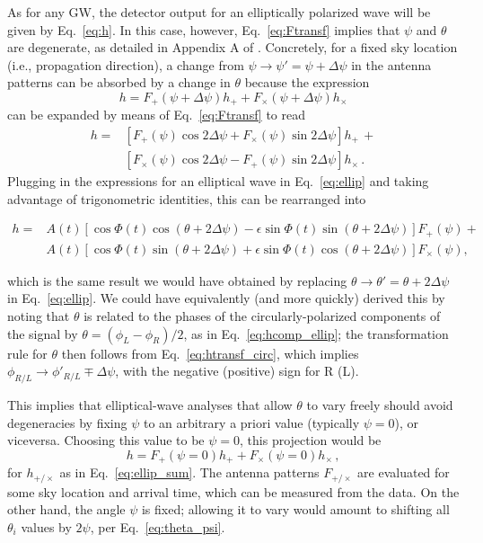 \documentclass[aps,prd,twocolumn,superscriptaddress,preprintnumbers,floatfix,nofootinbib]{revtex4-2}
\newcommand{\beq}{\begin{equation}}
\newcommand{\eeq}{\end{equation}}
\newcommand*{\eq}[1]{Eq.~\eqref{eq:#1}}
\begin{document}

As for any GW, the detector output for an elliptically polarized wave will be given by \eq{h}.
In this case, however, \eq{Ftransf} implies that $\psi$ and $\theta$ are degenerate, as detailed in Appendix A of \cite{Isi:2017equ}.
Concretely, for a fixed sky location (i.e., propagation direction), a change from $\psi \to \psi' = \psi + \Delta\psi$ in the antenna patterns can be absorbed by a change in $\theta$ because the expression
\beq
h = F_+(\psi + \Delta \psi) h_+ + F_\times(\psi + \Delta \psi) h_\times 
\eeq
can be expanded by means of \eq{Ftransf} to read
\begin{align}
h = &\left[ F_+(\psi) \cos 2\Delta\psi + F_\times(\psi) \sin 2\Delta\psi \right] h_+\, + \\
 &\left[F_\times(\psi) \cos 2\Delta\psi - F_+(\psi)\sin 2\Delta\psi\right] h_\times \, .
\end{align}
Plugging in the expressions for an elliptical wave in \eq{ellip} and taking advantage of trigonometric identities, this can be rearranged into
\begin{widetext}
\begin{align} \label{eq:theta_psi}
h = & A(t) \left[\cos \Phi(t) \cos(\theta + 2\Delta\psi) -  \epsilon \sin \Phi(t)\sin(\theta + 2\Delta\psi) \right] F_+(\psi) +\nonumber\\
&A(t) \left[\cos \Phi(t) \sin(\theta + 2\Delta\psi) + \epsilon \sin \Phi(t) \cos(\theta + 2\Delta\psi) \right] F_\times(\psi), 
\end{align}
\end{widetext}
which is the same result we would have obtained by replacing $\theta \to \theta' = \theta + 2 \Delta\psi$ in \eq{ellip}.
We could have equivalently (and more quickly) derived this by noting that $\theta$ is related to the phases of the circularly-polarized components of the signal by $\theta = \left(\phi_L - \phi_R\right)/2$, as in \eq{hcomp_ellip}; the transformation rule for $\theta$ then follows from \eq{htransf_circ}, which implies $\phi_{R/L} \to \phi'_{R/L} \mp \Delta\psi$, with the negative (positive) sign for R (L).

This implies that elliptical-wave analyses that allow $\theta$ to vary freely should avoid degeneracies by fixing $\psi$ to an arbitrary a priori value (typically $\psi=0$), or viceversa.
Choosing this value to be $\psi=0$, this projection would be
\begin{equation}
h = F_+(\psi=0) h_+ + F_\times(\psi=0) h_\times \, ,
\end{equation}
for $h_{+/\times}$ as in Eq.~\eqref{eq:ellip_sum}.
The antenna patterns $F_{+/\times}$ are evaluated for some sky location and arrival time, which can be measured from the data.
On the other hand, the angle $\psi$ is fixed; allowing it to vary would amount to shifting all $\theta_i$ values by $2\psi$, per Eq.~\eqref{eq:theta_psi}.
\end{document}
